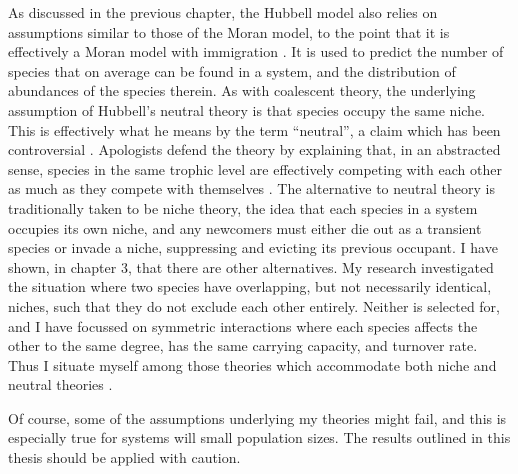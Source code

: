 As discussed in the previous chapter, the Hubbell model also relies on assumptions similar to those of the Moran model, to the point that it is effectively a Moran model with immigration \cite{Hubbell2001,others?}. 
It is used to predict the number of species that on average can be found in a system, and the distribution of abundances of the species therein. 
As with coalescent theory, the underlying assumption of Hubbell's neutral theory is that species occupy the same niche. 
This is effectively what he means by the term ``neutral'', a claim which has been controversial \cite{???}. 
Apologists defend the theory by explaining that, in an abstracted sense, species in the same trophic level are effectively competing with each other as much as they compete with themselves \cite{???}. 
The alternative to neutral theory is traditionally taken to be niche theory, the idea that each species in a system occupies its own niche, and any newcomers must either die out as a transient species or invade a niche, suppressing and evicting its previous occupant. 
I have shown, in chapter 3, that there are other alternatives. 
My research investigated the situation where two species have overlapping, but not necessarily identical, niches, such that they do not exclude each other entirely. 
Neither is selected for, and I have focussed on symmetric interactions where each species affects the other to the same degree, has the same carrying capacity, and turnover rate. 
Thus I situate myself among those theories which accommodate both niche and neutral theories \cite{???}. 


Of course, some of the assumptions underlying my theories might fail, and this is especially true for systems will small population sizes. 
The results outlined in this thesis should be applied with caution. 


